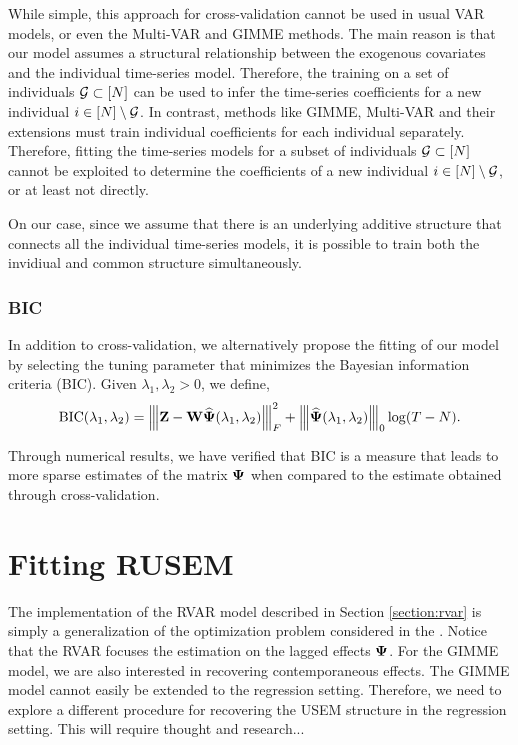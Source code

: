 While simple, this approach for cross-validation cannot be used in usual VAR models, or even the Multi-VAR and GIMME methods. The main reason is that our model assumes a structural relationship between the exogenous covariates and the individual time-series model. Therefore, the training on a set of individuals $\mathcal{G}\subset [N]$ can be used to infer the time-series coefficients for a new individual $i\in [N] \setminus \mathcal{G}$. In contrast, methods like GIMME, Multi-VAR and their extensions must train individual coefficients for each individual separately. Therefore, fitting the time-series models for a subset of individuals $\mathcal{G}\subset [N]$ cannot be exploited to determine the coefficients of a new individual $i\in [N] \setminus \mathcal{G}$, or at least not directly.

On our case, since we assume that there is an underlying additive structure that connects all the individual time-series models, it is possible to train both the invidiual and common structure simultaneously. 


\subsubsection{BIC}

In addition to cross-validation, we alternatively propose the fitting of our model by selecting the tuning parameter that minimizes the Bayesian information criteria (BIC). Given $\lambda_1,\lambda_2 > 0$, we define,
\begin{equation}\label{eq:bic}
	\mathrm{BIC}(\lambda_1,\lambda_2) =  {\left\vert\kern-0.25ex\left\vert\kern-0.25ex\left\vert  \mathbf{Z} - \mathbf{W} \widehat{\bm{\Psi}}(\lambda_1,\lambda_2)  \right\vert\kern-0.25ex\right\vert\kern-0.25ex\right\vert}_{F}^2 + {\left\vert\kern-0.25ex\left\vert\kern-0.25ex\left\vert \widehat{\bm{\Psi}}(\lambda_1,\lambda_2) \right\vert\kern-0.25ex\right\vert\kern-0.25ex\right\vert}_0 \log(T-N)  . 
\end{equation}

Through numerical results, we have verified that BIC is a measure that leads to more sparse estimates of the matrix $\bm{\Psi}$ when compared to the estimate obtained through cross-validation.

\section{Fitting RUSEM}


The implementation of the RVAR model described in Section \ref{section:rvar} is simply a generalization of the optimization problem considered in the \citet{fisher2022penalized}. Notice that the RVAR focuses the estimation on the lagged effects $\bm{\Psi}$. For the GIMME model, we are also interested in recovering contemporaneous effects. The GIMME model cannot easily be extended to the regression setting. Therefore, we need to explore a different procedure for recovering the USEM structure in the regression setting. This will require thought and research...

